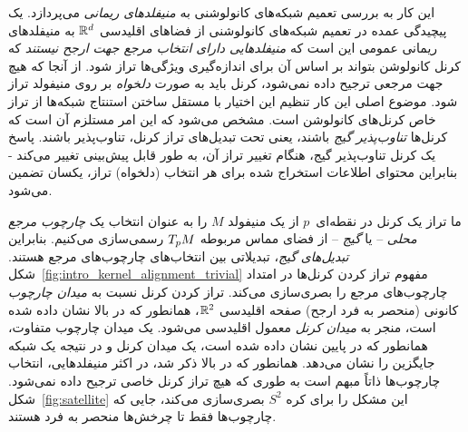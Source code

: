 این کار به بررسی تعمیم شبکه‌های کانولوشنی به \emph{منیفلدهای ریمانی} می‌پردازد.
یک پیچیدگی عمده در تعمیم شبکه‌های کانولوشنی از فضاهای اقلیدسی $\mathbb{R}^d$ به منیفلدهای ریمانی عمومی این است که \emph{منیفلدهایی دارای انتخاب مرجع جهت ارجح نیستند} که کرنل کانولوشن بتواند بر اساس آن برای اندازه‌گیری ویژگی‌ها تراز شود.
از آنجا که هیچ جهت مرجعی ترجیح داده نمی‌شود، کرنل باید به صورت \emph{دلخواه} بر روی منیفولد تراز شود.
موضوع اصلی این کار تنظیم این اختیار با مستقل ساختن استنتاج شبکه‌ها از تراز خاص کرنل‌های کانولوشن است.
مشخص می‌شود که این امر مستلزم آن است که کرنل‌ها \emph{تناوب‌پذیر گیج} باشند، یعنی تحت تبدیل‌های تراز کرنل، تناوب‌پذیر باشند.
پاسخ یک کرنل تناوب‌پذیر گیج، هنگام تغییر تراز آن، به طور قابل پیش‌بینی تغییر می‌کند - بنابراین محتوای اطلاعات استخراج شده برای هر انتخاب (دلخواه) تراز، یکسان تضمین می‌شود.


ما تراز یک کرنل در نقطه‌ای~$p$ از یک منیفولد $M$ را به عنوان انتخاب یک \emph{چارچوب مرجع محلی} – یا \emph{گیج} – از فضای مماس مربوطه $T_p M$ رسمی‌سازی می‌کنیم.
بنابراین \emph{تبدیل‌های گیج}، تبدیلاتی بین انتخاب‌های چارچوب‌های مرجع هستند.
شکل~\ref{fig:intro_kernel_alignment_trivial} مفهوم تراز کردن کرنل‌ها در امتداد چارچوب‌های مرجع را بصری‌سازی می‌کند.
تراز کردن کرنل نسبت به \emph{میدان چارچوب} کانونی (منحصر به فرد ارجح) صفحه اقلیدسی $\mathbb{R}^2$، همانطور که در بالا نشان داده شده است، منجر به \emph{میدان کرنل} معمول  اقلیدسی می‌شود.
یک میدان چارچوب متفاوت، همانطور که در پایین نشان داده شده است، یک میدان کرنل و در نتیجه یک شبکه جایگزین را نشان می‌دهد.
همانطور که در بالا ذکر شد، در اکثر منیفلدهایی، انتخاب چارچوب‌ها ذاتاً مبهم است به طوری که هیچ تراز کرنل خاصی ترجیح داده نمی‌شود.
شکل~\ref{fig:satellite} این مشکل را برای کره $S^2$ بصری‌سازی می‌کند، جایی که چارچوب‌ها فقط تا چرخش‌ها منحصر به فرد هستند.


